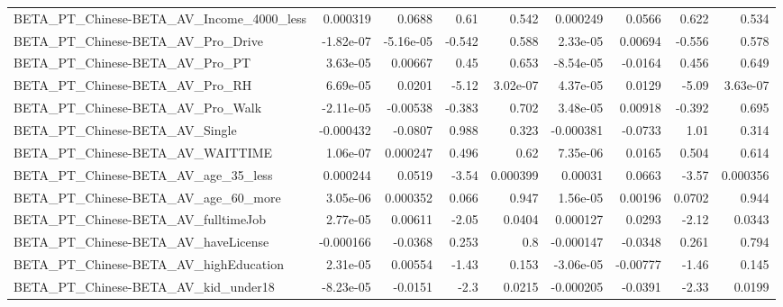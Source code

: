 \begin{tabular}{lrrrrrrrr}
BETA\_PT\_Chinese-BETA\_AV\_Income\_4000\_less           &    0.000319 &       0.0688 &      0.61 &    0.542 &   0.000249 &      0.0566 &        0.622 &         0.534 \\
BETA\_PT\_Chinese-BETA\_AV\_Pro\_Drive                  &   -1.82e-07 &    -5.16e-05 &    -0.542 &    0.588 &   2.33e-05 &     0.00694 &       -0.556 &         0.578 \\
BETA\_PT\_Chinese-BETA\_AV\_Pro\_PT                     &    3.63e-05 &      0.00667 &      0.45 &    0.653 &  -8.54e-05 &     -0.0164 &        0.456 &         0.649 \\
BETA\_PT\_Chinese-BETA\_AV\_Pro\_RH                     &    6.69e-05 &       0.0201 &     -5.12 & 3.02e-07 &   4.37e-05 &      0.0129 &        -5.09 &      3.63e-07 \\
BETA\_PT\_Chinese-BETA\_AV\_Pro\_Walk                   &   -2.11e-05 &     -0.00538 &    -0.383 &    0.702 &   3.48e-05 &     0.00918 &       -0.392 &         0.695 \\
BETA\_PT\_Chinese-BETA\_AV\_Single                     &   -0.000432 &      -0.0807 &     0.988 &    0.323 &  -0.000381 &     -0.0733 &         1.01 &         0.314 \\
BETA\_PT\_Chinese-BETA\_AV\_WAITTIME                   &    1.06e-07 &     0.000247 &     0.496 &     0.62 &   7.35e-06 &      0.0165 &        0.504 &         0.614 \\
BETA\_PT\_Chinese-BETA\_AV\_age\_35\_less                &    0.000244 &       0.0519 &     -3.54 & 0.000399 &    0.00031 &      0.0663 &        -3.57 &      0.000356 \\
BETA\_PT\_Chinese-BETA\_AV\_age\_60\_more                &    3.05e-06 &     0.000352 &     0.066 &    0.947 &   1.56e-05 &     0.00196 &       0.0702 &         0.944 \\
BETA\_PT\_Chinese-BETA\_AV\_fulltimeJob                &    2.77e-05 &      0.00611 &     -2.05 &   0.0404 &   0.000127 &      0.0293 &        -2.12 &        0.0343 \\
BETA\_PT\_Chinese-BETA\_AV\_haveLicense                &   -0.000166 &      -0.0368 &     0.253 &      0.8 &  -0.000147 &     -0.0348 &        0.261 &         0.794 \\
BETA\_PT\_Chinese-BETA\_AV\_highEducation              &    2.31e-05 &      0.00554 &     -1.43 &    0.153 &  -3.06e-05 &    -0.00777 &        -1.46 &         0.145 \\
BETA\_PT\_Chinese-BETA\_AV\_kid\_under18                &   -8.23e-05 &      -0.0151 &      -2.3 &   0.0215 &  -0.000205 &     -0.0391 &        -2.33 &        0.0199 \\

\end{tabular}
